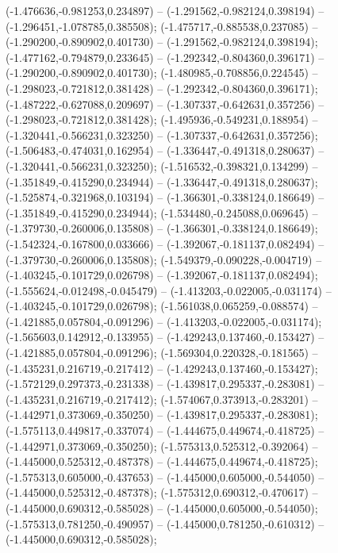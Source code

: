  (-1.476636,-0.981253,0.234897) -- (-1.291562,-0.982124,0.398194) -- (-1.296451,-1.078785,0.385508);
 (-1.475717,-0.885538,0.237085) -- (-1.290200,-0.890902,0.401730) -- (-1.291562,-0.982124,0.398194);
 (-1.477162,-0.794879,0.233645) -- (-1.292342,-0.804360,0.396171) -- (-1.290200,-0.890902,0.401730);
 (-1.480985,-0.708856,0.224545) -- (-1.298023,-0.721812,0.381428) -- (-1.292342,-0.804360,0.396171);
 (-1.487222,-0.627088,0.209697) -- (-1.307337,-0.642631,0.357256) -- (-1.298023,-0.721812,0.381428);
 (-1.495936,-0.549231,0.188954) -- (-1.320441,-0.566231,0.323250) -- (-1.307337,-0.642631,0.357256);
 (-1.506483,-0.474031,0.162954) -- (-1.336447,-0.491318,0.280637) -- (-1.320441,-0.566231,0.323250);
 (-1.516532,-0.398321,0.134299) -- (-1.351849,-0.415290,0.234944) -- (-1.336447,-0.491318,0.280637);
 (-1.525874,-0.321968,0.103194) -- (-1.366301,-0.338124,0.186649) -- (-1.351849,-0.415290,0.234944);
 (-1.534480,-0.245088,0.069645) -- (-1.379730,-0.260006,0.135808) -- (-1.366301,-0.338124,0.186649);
 (-1.542324,-0.167800,0.033666) -- (-1.392067,-0.181137,0.082494) -- (-1.379730,-0.260006,0.135808);
 (-1.549379,-0.090228,-0.004719) -- (-1.403245,-0.101729,0.026798) -- (-1.392067,-0.181137,0.082494);
 (-1.555624,-0.012498,-0.045479) -- (-1.413203,-0.022005,-0.031174) -- (-1.403245,-0.101729,0.026798);
 (-1.561038,0.065259,-0.088574) -- (-1.421885,0.057804,-0.091296) -- (-1.413203,-0.022005,-0.031174);
 (-1.565603,0.142912,-0.133955) -- (-1.429243,0.137460,-0.153427) -- (-1.421885,0.057804,-0.091296);
 (-1.569304,0.220328,-0.181565) -- (-1.435231,0.216719,-0.217412) -- (-1.429243,0.137460,-0.153427);
 (-1.572129,0.297373,-0.231338) -- (-1.439817,0.295337,-0.283081) -- (-1.435231,0.216719,-0.217412);
 (-1.574067,0.373913,-0.283201) -- (-1.442971,0.373069,-0.350250) -- (-1.439817,0.295337,-0.283081);
 (-1.575113,0.449817,-0.337074) -- (-1.444675,0.449674,-0.418725) -- (-1.442971,0.373069,-0.350250);
 (-1.575313,0.525312,-0.392064) -- (-1.445000,0.525312,-0.487378) -- (-1.444675,0.449674,-0.418725);
 (-1.575313,0.605000,-0.437653) -- (-1.445000,0.605000,-0.544050) -- (-1.445000,0.525312,-0.487378);
 (-1.575312,0.690312,-0.470617) -- (-1.445000,0.690312,-0.585028) -- (-1.445000,0.605000,-0.544050);
 (-1.575313,0.781250,-0.490957) -- (-1.445000,0.781250,-0.610312) -- (-1.445000,0.690312,-0.585028);
